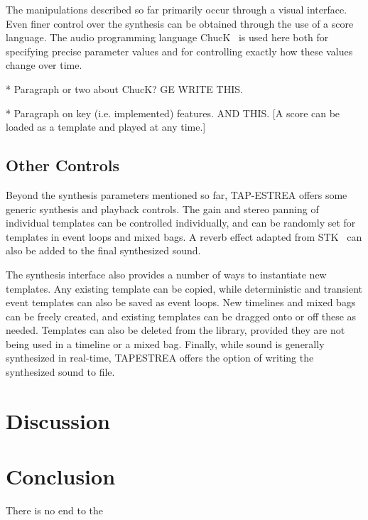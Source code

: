 \documentclass[10pt,letterpaper]{article}
\begin{document}
The manipulations described so far primarily occur through a
visual interface. Even finer control over the synthesis can be obtained
through the use of a score language. The audio programming language
ChucK~\cite{Wang03} is used here both for specifying precise
parameter values and for controlling exactly how these values change
over time. 

* Paragraph or two about ChucK?  GE WRITE THIS.

* Paragraph on key (i.e. implemented) features.  AND THIS. [A score can be loaded as a template and played at any time.]

\subsection{Other Controls}

Beyond the synthesis parameters mentioned so far, TAP-ESTREA offers some
generic synthesis and playback controls. The gain and stereo panning of
individual templates can be controlled individually, and can be randomly
set for templates in event loops and mixed bags. A reverb effect adapted
from STK~\cite{Cook99} can also be added to the final synthesized sound.

The synthesis interface also provides a number of ways to instantiate new templates. Any
existing template can be copied, while deterministic and transient event
templates can also be saved as event loops. New timelines and mixed bags
can be freely created, and existing templates can be dragged onto or off
these as needed. Templates can also be deleted from the library,
provided they are not being used in a timeline or a mixed bag. Finally,
while sound is generally synthesized in real-time, TAPESTREA offers the
option of writing the synthesized sound to file.

\section{Discussion}


\section{Conclusion}

There is no end to the 

\end{document}
